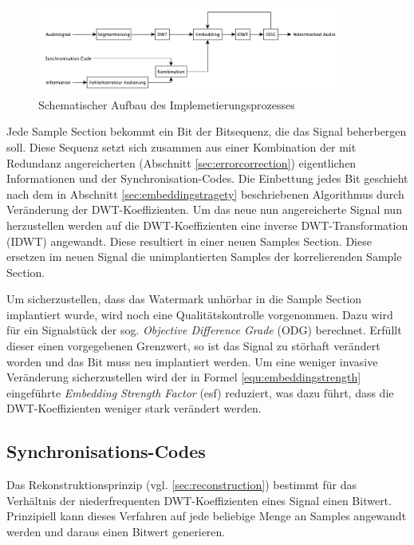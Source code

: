 \begin{figure}[h]
	\centering
	\includegraphics[width=0.9\textwidth]{figures/diagram-encoder.pdf}
	\caption{Schematischer Aufbau des Implemetierungsprozesses}
	\label{fig:diagram-encoder}
\end{figure}

Jede Sample Section bekommt ein Bit der Bitsequenz, die das Signal beherbergen soll. Diese Sequenz setzt sich zusammen aus einer Kombination der mit Redundanz angereicherten (Abschnitt \ref{sec:errorcorrection}) eigentlichen Informationen und der Synchronisation-Codes. Die Einbettung jedes Bit geschieht nach dem in Abschnitt \ref{sec:embeddingstragety} beschriebenen Algorithmus durch Veränderung der DWT-Koeffizienten. Um das neue nun angereicherte Signal nun herzustellen werden auf die DWT-Koeffizienten eine inverse DWT-Transformation (IDWT) angewandt. Diese resultiert in einer neuen Samples Section. Diese ersetzen im neuen Signal die unimplantierten Samples der korrelierenden Sample Section. 

Um sicherzustellen, dass das Watermark unhörbar in die Sample Section implantiert wurde, wird noch eine Qualitätskontrolle vorgenommen. Dazu wird für ein Signalstück der sog. \textit{Objective Difference Grade} (ODG) berechnet. Erfüllt dieser einen vorgegebenen Grenzwert, so ist das Signal zu störhaft verändert worden und das Bit muss neu implantiert werden. Um eine weniger invasive Veränderung sicherzustellen wird der in Formel \ref{equ:embeddingstrength} eingeführte \textit{Embedding Strength Factor} (esf) reduziert, was dazu führt, dass die DWT-Koeffizienten weniger stark verändert werden.

\subsection{Synchronisations-Codes}

Das Rekonstruktionsprinzip (vgl. \ref{sec:reconstruction}) bestimmt für das Verhältnis der niederfrequenten DWT-Koeffizienten eines Signal einen Bitwert. Prinzipiell kann dieses Verfahren auf jede beliebige Menge an Samples angewandt werden und daraus einen Bitwert generieren. 

